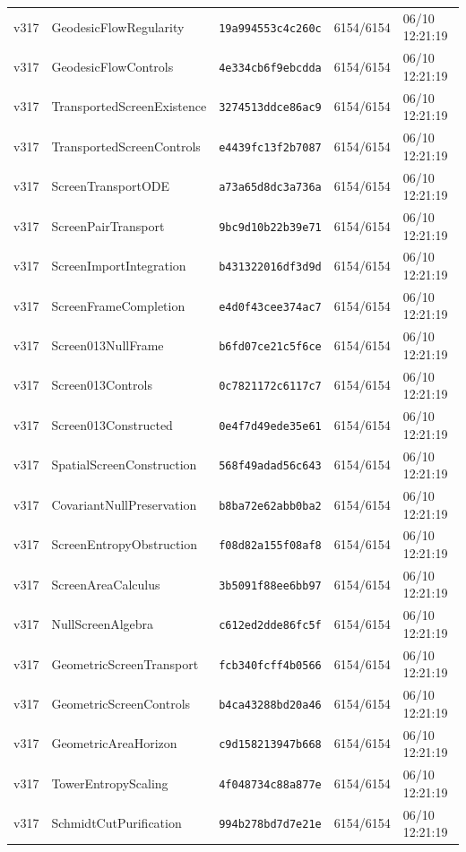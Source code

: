 \documentclass[11pt]{article}
\theoremstyle{definition}\newtheorem{deriv}{Derivation}
\begin{document}
{\begin{longtable}{@{}lllll@{}}
v317 & GeodesicFlowRegularity & \texttt{19a994553c4c260c} & 6154/6154 & 06/10 12:21:19 \\
v317 & GeodesicFlowControls & \texttt{4e334cb6f9ebcdda} & 6154/6154 & 06/10 12:21:19 \\
v317 & TransportedScreenExistence & \texttt{3274513ddce86ac9} & 6154/6154 & 06/10 12:21:19 \\
v317 & TransportedScreenControls & \texttt{e4439fc13f2b7087} & 6154/6154 & 06/10 12:21:19 \\
v317 & ScreenTransportODE & \texttt{a73a65d8dc3a736a} & 6154/6154 & 06/10 12:21:19 \\
v317 & ScreenPairTransport & \texttt{9bc9d10b22b39e71} & 6154/6154 & 06/10 12:21:19 \\
v317 & ScreenImportIntegration & \texttt{b431322016df3d9d} & 6154/6154 & 06/10 12:21:19 \\
v317 & ScreenFrameCompletion & \texttt{e4d0f43cee374ac7} & 6154/6154 & 06/10 12:21:19 \\
v317 & Screen013NullFrame & \texttt{b6fd07ce21c5f6ce} & 6154/6154 & 06/10 12:21:19 \\
v317 & Screen013Controls & \texttt{0c7821172c6117c7} & 6154/6154 & 06/10 12:21:19 \\
v317 & Screen013Constructed & \texttt{0e4f7d49ede35e61} & 6154/6154 & 06/10 12:21:19 \\
v317 & SpatialScreenConstruction & \texttt{568f49adad56c643} & 6154/6154 & 06/10 12:21:19 \\
v317 & CovariantNullPreservation & \texttt{b8ba72e62abb0ba2} & 6154/6154 & 06/10 12:21:19 \\
v317 & ScreenEntropyObstruction & \texttt{f08d82a155f08af8} & 6154/6154 & 06/10 12:21:19 \\
v317 & ScreenAreaCalculus & \texttt{3b5091f88ee6bb97} & 6154/6154 & 06/10 12:21:19 \\
v317 & NullScreenAlgebra & \texttt{c612ed2dde86fc5f} & 6154/6154 & 06/10 12:21:19 \\
v317 & GeometricScreenTransport & \texttt{fcb340fcff4b0566} & 6154/6154 & 06/10 12:21:19 \\
v317 & GeometricScreenControls & \texttt{b4ca43288bd20a46} & 6154/6154 & 06/10 12:21:19 \\
v317 & GeometricAreaHorizon & \texttt{c9d158213947b668} & 6154/6154 & 06/10 12:21:19 \\
v317 & TowerEntropyScaling & \texttt{4f048734c88a877e} & 6154/6154 & 06/10 12:21:19 \\
v317 & SchmidtCutPurification & \texttt{994b278bd7d7e21e} & 6154/6154 & 06/10 12:21:19 \\

\end{longtable}}
\end{document}
